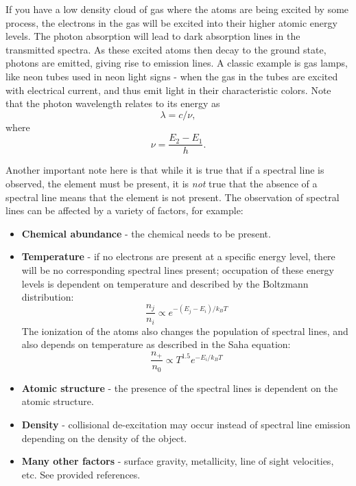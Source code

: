 \documentclass{../lab}
\begin{document}
If you have a low density cloud of gas where the atoms are being excited by some process, the electrons in the gas will be excited into their higher atomic energy levels. The photon absorption will lead to dark absorption lines in the transmitted spectra. As these excited atoms then decay to the ground state, photons are emitted, giving rise to emission lines. A classic example is gas lamps, like neon tubes used in neon light signs - when the gas in the tubes are excited with electrical current, and thus emit light in their characteristic colors. Note that the photon wavelength relates to its energy as $$\lambda = c / \nu, $$ where 
% 
% 
\begin{equation}
    \nu = \frac{E_2 - E_1}{h}.
\end{equation}

Another important note here is that while it is true that if a spectral line is observed, the element must be present, it is \textit{not} true that the absence of a spectral line means that the element is not present. The observation of spectral lines can be affected by a variety of factors, for example:

\begin{itemize}
    \item \textbf{Chemical abundance} - the chemical needs to be present.
    \item \textbf{Temperature} - if no electrons are present at a specific energy level, there will be no corresponding spectral lines present; occupation of these energy levels is dependent on temperature and described by the Boltzmann distribution:
    \begin{equation}
        \frac{n_j}{n_i} \propto e^{-(E_j - E_i)/k_BT}
    \end{equation}
    The ionization of the atoms also changes the population of spectral lines, and also depends on temperature as described in the Saha equation:
    \begin{equation}
        \frac{n_+}{n_0} \propto T^{1.5}e^{-E_i/k_BT}
    \end{equation}
    \item \textbf{Atomic structure} - the presence of the spectral lines is dependent on the atomic structure.
    \item \textbf{Density} - collisional de-excitation may occur instead of spectral line emission depending on the density of the object.
    \item \textbf{Many other factors} - surface gravity, metallicity, line of sight velocities, etc. See provided references.
\end{itemize}
\end{document}
